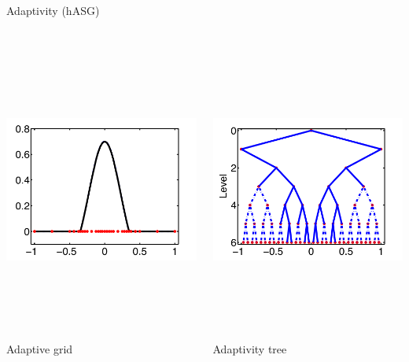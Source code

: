 \documentclass[final]{beamer}
\begin{document}
\begin{frame}{}
{\begin{columns}[t]
\begin{column}{.30\linewidth}
\begin{block}{\centering Adaptivity (hASG)}
\begin{columns}[T]
\begin{column}{16cm}{}
\centering \includegraphics[height=10cm, width = 16cm]{figures/1Dadaptivefunc}\\
\centering \scriptsize{Adaptive grid}
\end{column}
\begin{column}{16cm}{}
\raggedleft \includegraphics[height=10cm, width = 16cm]{figures/1Dadaptivetree}\\
\centering \scriptsize{Adaptivity tree}
\end{column}
\end{columns}


\end{block}
\end{column}
\end{columns}}
\end{frame}
\end{document}
